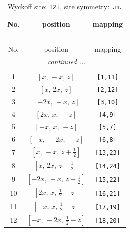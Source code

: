 \documentclass[fleqn,8pt]{jsarticle}
\begin{document}
\begin{longtable}{ccc}
\caption{Wyckoff site: {\tt 12i}, site symmetry: {\tt .m.}}
 \\
 \hline \hline
No. & position & mapping \\ \hline \endfirsthead

\multicolumn{2}{l}{\tablename\ \thetable{}} \\
 \hline \hline
No. & position & mapping \\ \hline \endhead

 \hline \hline
\multicolumn{2}{r}{\footnotesize\it continued ...} \\ \endfoot

 \hline \hline
\multicolumn{2}{r}{} \\ \endlastfoot

1 & $\left[ x,\, - x,\, z \right]$ & {\tt [1,11]} \\ \hline
2 & $\left[ x,\, 2 x,\, z \right]$ & {\tt [2,12]} \\ \hline
3 & $\left[ - 2 x,\, - x,\, z \right]$ & {\tt [3,10]} \\ \hline
4 & $\left[ 2 x,\, x,\, - z \right]$ & {\tt [4,9]} \\ \hline
5 & $\left[ - x,\, x,\, - z \right]$ & {\tt [5,7]} \\ \hline
6 & $\left[ - x,\, - 2 x,\, - z \right]$ & {\tt [6,8]} \\ \hline
7 & $\left[ x,\, - x,\, z + \frac{1}{2} \right]$ & {\tt [13,23]} \\ \hline
8 & $\left[ x,\, 2 x,\, z + \frac{1}{2} \right]$ & {\tt [14,24]} \\ \hline
9 & $\left[ - 2 x,\, - x,\, z + \frac{1}{2} \right]$ & {\tt [15,22]} \\ \hline
10 & $\left[ 2 x,\, x,\, \frac{1}{2} - z \right]$ & {\tt [16,21]} \\ \hline
11 & $\left[ - x,\, x,\, \frac{1}{2} - z \right]$ & {\tt [17,19]} \\ \hline
12 & $\left[ - x,\, - 2 x,\, \frac{1}{2} - z \right]$ & {\tt [18,20]} \\
\end{longtable}
\renewcommand{\arraystretch}{1.2}
\end{document}
